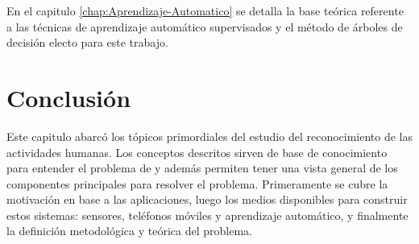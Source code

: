 En el capitulo \ref{chap:Aprendizaje-Automatico} se detalla la base
teórica referente a las técnicas de aprendizaje automático supervisados
y el método de árboles de decisión electo para este trabajo.

\section{Conclusión}

\label{sec27:conclusion}Este capitulo abarcó los tópicos primordiales
del estudio del reconocimiento de las actividades humanas. Los conceptos
descritos sirven de base de conocimiento para entender el problema
de  y además permiten tener una vista general de los componentes
principales para resolver el problema. Primeramente se cubre la motivación
en base a las aplicaciones, luego los medios disponibles para construir
estos sistemas: sensores, teléfonos móviles y aprendizaje automático,
y finalmente la definición metodológica y teórica del problema. 
